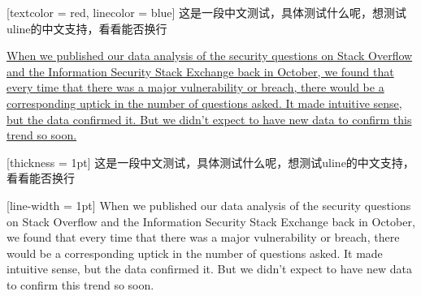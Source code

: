 \documentclass{ctexart}
\begin{document}
\underline[textcolor = red, linecolor = blue]{
  这是一段中文测试，具体测试什么呢，想测试uline的中文支持，看看能否换行
}

\underline{
  When we published our data analysis of the security questions on Stack Overflow and the Information Security Stack Exchange back in October, we found that every time that there was a major vulnerability or breach, there would be a corresponding uptick in the number of questions asked. It made intuitive sense, but the data confirmed it. But we didn’t expect to have new data to confirm this trend so soon. 
}

\underline*[thickness = 1pt]{
  这是一段中文测试，具体测试什么呢，想测试uline的中文支持，看看能否换行
}

\underline*[line-width = 1pt]{
  When we published our data analysis of the security questions on Stack Overflow and the Information Security Stack Exchange back in October, we found that every time that there was a major vulnerability or breach, there would be a corresponding uptick in the number of questions asked. It made intuitive sense, but the data confirmed it. But we didn’t expect to have new data to confirm this trend so soon. 
}
\end{document}
